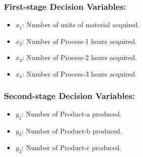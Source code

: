 \documentclass[7pt]{article}
\begin{document}
\noindent
\begin{minipage}[t]{0.48\textwidth}
    \subsubsection*{First-stage Decision Variables:}
    \vspace{-0.5em}
    \small
    \begin{itemize}[leftmargin=*, noitemsep]
        \item $x_1$: Number of units of material acquired.
        \item $x_2$: Number of Process-1 hours acquired.
        \item $x_3$: Number of Process-2 hours acquired.
        \item $x_4$: Number of Process-3 hours acquired.
    \end{itemize}
\end{minipage}
\hfill
\begin{minipage}[t]{0.48\textwidth}
    \subsubsection*{Second-stage Decision Variables:}
    \vspace{-0.5em}
    \small
    \begin{itemize}[leftmargin=*, noitemsep]
        \item $y_1$: Number of Product-a produced.
        \item $y_2$: Number of Product-b produced.
        \item $y_3$: Number of Product-c produced.
    \end{itemize}
\end{minipage}

\vspace{0.2em}
\end{document}
